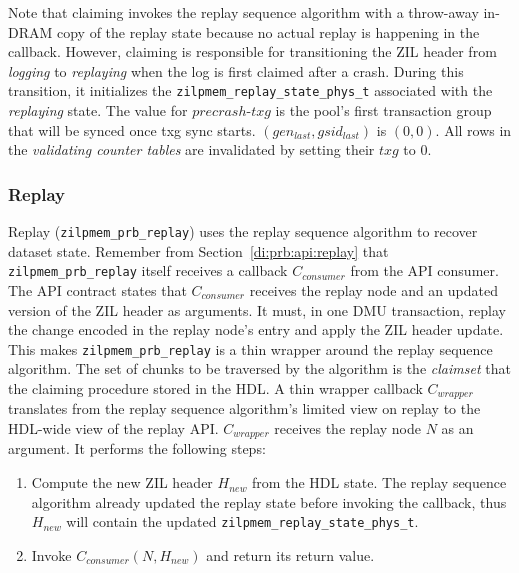 \documentclass[12pt,a4paper,twoside]{book}
\begin{document}
Note that claiming invokes the replay sequence algorithm with a throw-away in-DRAM copy of the replay state because no actual replay is happening in the callback.
However, claiming is responsible for transitioning the ZIL header from \textit{logging} to \textit{replaying} when the log is first claimed after a crash.
During this transition, it initializes the \lstinline{zilpmem_replay_state_phys_t} associated with the \textit{replaying} state.
The value for $precrash\text{-}txg$ is the pool's first transaction group that will be synced once txg sync starts.
$(gen_{last}, gsid_{last})$ is $(0, 0)$.
All rows in the \textit{validating counter tables} are invalidated by setting their $txg$ to $0$.

\subsubsection{Replay}
Replay (\lstinline{zilpmem_prb_replay}) uses the replay sequence algorithm to recover dataset state.
Remember from Section~\ref{di:prb:api:replay} that \lstinline{zilpmem_prb_replay} itself receives a callback $C_{consumer}$ from the API consumer.
The API contract states that $C_{consumer}$ receives the replay node and an updated version of the ZIL header as arguments.
It must, in one DMU transaction, replay the change encoded in the replay node's entry and apply the ZIL header update.
This makes \lstinline{zilpmem_prb_replay} is a thin wrapper around the replay sequence algorithm.
The set of chunks to be traversed by the algorithm is the \textit{claimset} that the claiming procedure stored in the HDL.
A thin wrapper callback $C_{wrapper}$ translates from the replay sequence algorithm's limited view on replay to the HDL-wide view of the replay API.
$C_{wrapper}$ receives the replay node $N$ as an argument. It performs the following steps:
\begin{enumerate}
    \item Compute the new ZIL header $H_{new}$ from the HDL state.
        The replay sequence algorithm already updated the replay state before invoking the callback, thus $H_{new}$ will contain the updated \lstinline{zilpmem_replay_state_phys_t}.
    \item Invoke $C_{consumer}(N, H_{new})$ and return its return value.
\end{enumerate}
\end{document}
